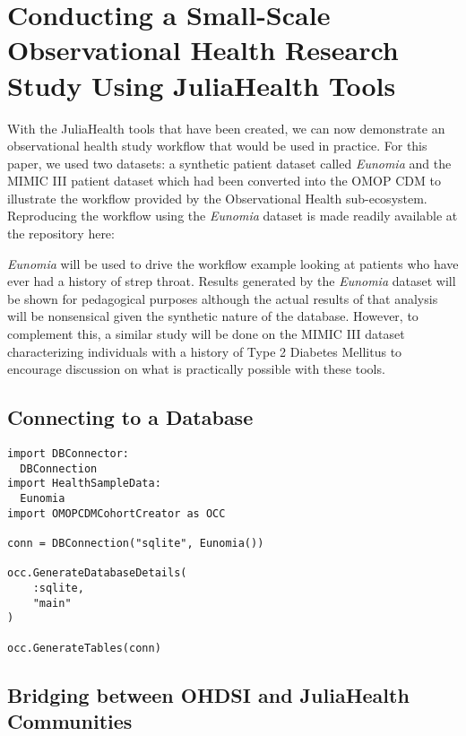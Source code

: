 \documentclass{juliacon}
\begin{document}
\section{Conducting a Small-Scale Observational Health Research Study Using JuliaHealth Tools}

With the JuliaHealth tools that have been created, we can now demonstrate an observational health study workflow that would be used in practice.
For this paper, we used two datasets: a synthetic patient dataset called \textit{Eunomia} and the MIMIC III patient dataset which had been converted into the OMOP CDM to illustrate the workflow provided by the Observational Health sub-ecosystem.
Reproducing the workflow using the \textit{Eunomia} dataset is made readily available at the repository here: \cite{schuemieEunomia2023}


\textit{Eunomia} will be used to drive the workflow example looking at patients who have ever had a history of strep throat.
Results generated by the \textit{Eunomia} dataset will be shown for pedagogical purposes although the actual results of that analysis will be nonsensical given the synthetic nature of the database.
However, to complement this, a similar study will be done on the MIMIC III dataset characterizing individuals with a history of Type 2 Diabetes Mellitus to encourage discussion on what is practically possible with these tools.

\subsection{Connecting to a Database}

\begin{verbatim}
import DBConnector: 
  DBConnection
import HealthSampleData: 
  Eunomia
import OMOPCDMCohortCreator as OCC

conn = DBConnection("sqlite", Eunomia())

occ.GenerateDatabaseDetails(
    :sqlite,
    "main"
)

occ.GenerateTables(conn)
\end{verbatim}

\subsection{Bridging between OHDSI and JuliaHealth Communities}
\end{document}
